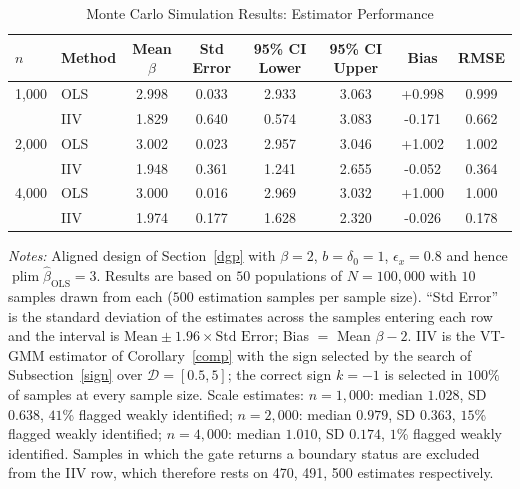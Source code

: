\begin{table}[htbp]
\centering
\caption{Monte Carlo Simulation Results: Estimator Performance}
\label{tab:simulation_results}
\begin{threeparttable}
\begin{tabular}{llcccccc}
\toprule
\(n\) & Method & Mean \(\beta\) & Std Error & 95\% CI Lower & 95\% CI Upper & Bias & RMSE \\
\midrule
1{,}000 & OLS  & 2.998 & 0.033 & 2.933 & 3.063 & +0.998 & 0.999 \\
        & IIV  & 1.829 & 0.640 & 0.574 & 3.083 & -0.171 & 0.662 \\
\midrule
2{,}000 & OLS  & 3.002 & 0.023 & 2.957 & 3.046 & +1.002 & 1.002 \\
        & IIV  & 1.948 & 0.361 & 1.241 & 2.655 & -0.052 & 0.364 \\
\midrule
4{,}000 & OLS  & 3.000 & 0.016 & 2.969 & 3.032 & +1.000 & 1.000 \\
        & IIV  & 1.974 & 0.177 & 1.628 & 2.320 & -0.026 & 0.178 \\
\bottomrule
\end{tabular}
\begin{tablenotes}
\small
\item \textit{Notes:} Aligned design of Section~\ref{dgp} with
\(\beta=2\), \(b=\delta_0=1\), \(\epsilon_x=0.8\) and hence
\(\operatorname{plim}\widehat\beta_{\mathrm{OLS}}=3\). Results are based on
\(50\) populations of \(N=100{,}000\) with \(10\) samples drawn from each
(\(500\) estimation samples per sample size). ``Std Error'' is the standard
deviation of the estimates across the samples entering each row and the
interval is \(\text{Mean}\pm1.96\times\text{Std Error}\); Bias \(=\)
Mean \(\beta-2\). IIV is the VT-GMM estimator of Corollary~\ref{comp}
with the sign selected by the search of Subsection~\ref{sign} over
\(\mathcal D=[0.5,5]\); the correct sign
\(k=-1\) is selected in \(100\%\) of samples at every sample size. Scale estimates: \(n=1{,}000\): median \(1.028\), SD \(0.638\), \(41\)\% flagged weakly identified; \(n=2{,}000\): median \(0.979\), SD \(0.363\), \(15\)\% flagged weakly identified; \(n=4{,}000\): median \(1.010\), SD \(0.174\), \(1\)\% flagged weakly identified. Samples in which the
gate returns a boundary status are excluded from the IIV row, which
therefore rests on 470, 491, 500 estimates respectively.
\end{tablenotes}
\end{threeparttable}
\end{table}
